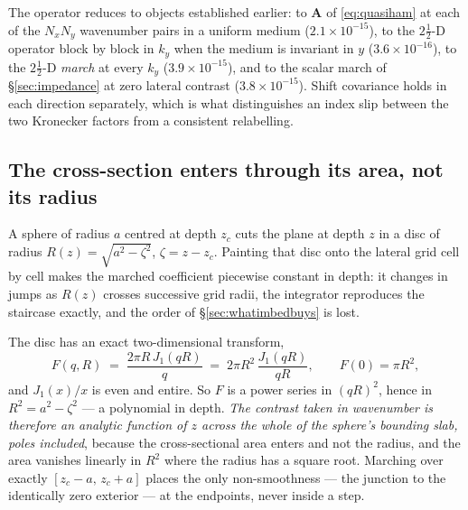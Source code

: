 \documentclass[11pt,a4paper]{article}
\newcommand{\bA}{\mathbf{A}}
\begin{document}
The operator reduces to objects established earlier: to $\bA$ of
\eqref{eq:quasiham} at each of the $N_xN_y$ wavenumber pairs in a uniform medium
($2.1\times10^{-15}$), to the $2\tfrac12$-D operator block by block in $k_y$
when the medium is invariant in $y$ ($3.6\times10^{-16}$), to the
$2\tfrac12$-D \emph{march} at every $k_y$ ($3.9\times10^{-15}$), and to the
scalar march of \S\ref{sec:impedance} at zero lateral contrast
($3.8\times10^{-15}$).  Shift covariance holds in each direction separately,
which is what distinguishes an index slip between the two Kronecker factors
from a consistent relabelling.

\subsection{The cross-section enters through its area, not its radius}

A sphere of radius $a$ centred at depth $z_c$ cuts the plane at depth $z$ in a
disc of radius $R(z)=\sqrt{a^2-\zeta^2}$, $\zeta = z-z_c$.  Painting that disc
onto the lateral grid cell by cell makes the marched coefficient piecewise
constant in depth: it changes in jumps as $R(z)$ crosses successive grid radii,
the integrator reproduces the staircase exactly, and the order of
\S\ref{sec:whatimbedbuys} is lost.

The disc has an exact two-dimensional transform,
\begin{equation}
  F(q,R) \;=\; \frac{2\pi R\,J_1(qR)}{q}
         \;=\; 2\pi R^2\,\frac{J_1(qR)}{qR},
  \qquad F(0)=\pi R^2 ,
  \label{eq:discff}
\end{equation}
and $J_1(x)/x$ is even and entire.  So $F$ is a power series in $(qR)^2$, hence
in $R^2 = a^2-\zeta^2$ --- a polynomial in depth.  \emph{The contrast taken in
wavenumber is therefore an analytic function of $z$ across the whole of the
sphere's bounding slab, poles included}, because the cross-sectional area enters
and not the radius, and the area vanishes linearly in $R^2$ where the radius has
a square root.  Marching over exactly $[z_c-a,\,z_c+a]$ places the only
non-smoothness --- the junction to the identically zero exterior --- at the
endpoints, never inside a step.
\end{document}
